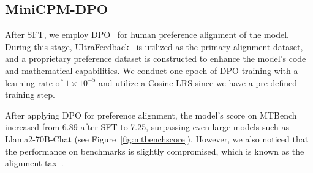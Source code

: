 
\subsection{MiniCPM-DPO}
\label{app:rlhf}
After SFT, we employ DPO~\citep{rafailov2024direct} for human preference alignment of the
model. During this stage, UltraFeedback~\citep{cui2023ultrafeedback} is utilized as the primary alignment dataset, and a proprietary preference dataset is constructed to enhance the model's code and mathematical capabilities. We conduct one epoch of DPO training with a learning rate of $1\times 10^{-5}$ and utilize a Cosine LRS since we have a pre-defined training step.
 
After applying DPO for preference alignment, the model's score on MTBench~\citep{zheng2024judging} increased from 6.89 after SFT to 7.25, surpassing even large models such as Llama2-70B-Chat (see Figure~\ref{fig:mtbenchscore}). However, we also noticed that the performance on benchmarks is slightly compromised, which is known as the alignment tax~\citep{askell2021general}.

